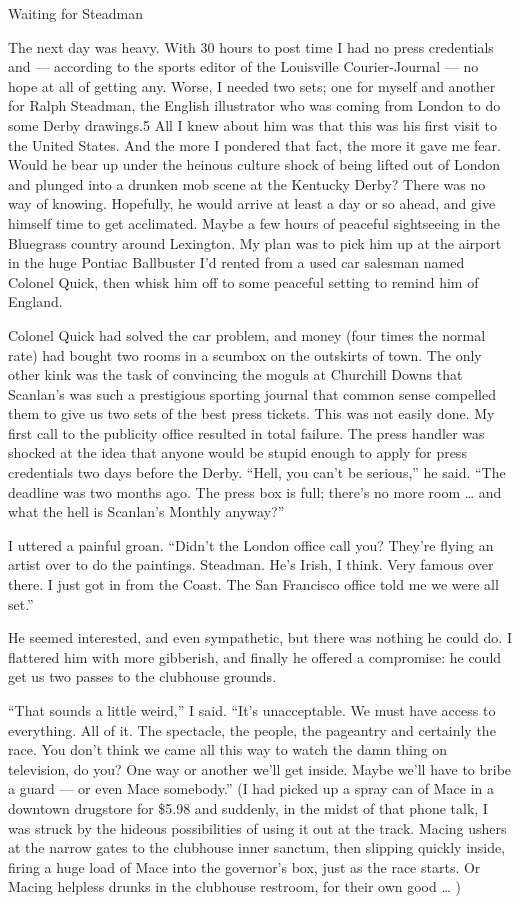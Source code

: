 \documentclass[10pt,a4paper]{article}
\begin{document}
Waiting for Steadman

The next day was heavy. With 30 hours to post time I had no press credentials and — according to the sports editor of the Louisville Courier-Journal — no hope at all of getting any. Worse, I needed two sets; one for myself and another for Ralph Steadman, the English illustrator who was coming from London to do some Derby drawings.5 All I knew about him was that this was his first visit to the United States. And the more I pondered that fact, the more it gave me fear. Would he bear up under the heinous culture shock of being lifted out of London and plunged into a drunken mob scene at the Kentucky Derby? There was no way of knowing. Hopefully, he would arrive at least a day or so ahead, and give himself time to get acclimated. Maybe a few hours of peaceful sightseeing in the Bluegrass country around Lexington. My plan was to pick him up at the airport in the huge Pontiac Ballbuster I’d rented from a used car salesman named Colonel Quick, then whisk him off to some peaceful setting to remind him of England.

Colonel Quick had solved the car problem, and money (four times the normal rate) had bought two rooms in a scumbox on the outskirts of town. The only other kink was the task of convincing the moguls at Churchill Downs that Scanlan’s was such a prestigious sporting journal that common sense compelled them to give us two sets of the best press tickets. This was not easily done. My first call to the publicity office resulted in total failure. The press handler was shocked at the idea that anyone would be stupid enough to apply for press credentials two days before the Derby. “Hell, you can’t be serious,” he said. “The deadline was two months ago. The press box is full; there’s no more room … and what the hell is Scanlan’s Monthly anyway?”

I uttered a painful groan. “Didn’t the London office call you? They’re flying an artist over to do the paintings. Steadman. He’s Irish, I think. Very famous over there. I just got in from the Coast. The San Francisco office told me we were all set.”

He seemed interested, and even sympathetic, but there was nothing he could do. I flattered him with more gibberish, and finally he offered a compromise: he could get us two passes to the clubhouse grounds.

“That sounds a little weird,” I said. “It’s unacceptable. We must have access to everything. All of it. The spectacle, the people, the pageantry and certainly the race. You don’t think we came all this way to watch the damn thing on television, do you? One way or another we’ll get inside. Maybe we’ll have to bribe a guard — or even Mace somebody.” (I had picked up a spray can of Mace in a downtown drugstore for \$5.98 and suddenly, in the midst of that phone talk, I was struck by the hideous possibilities of using it out at the track. Macing ushers at the narrow gates to the clubhouse inner sanctum, then slipping quickly inside, firing a huge load of Mace into the governor’s box, just as the race starts. Or Macing helpless drunks in the clubhouse restroom, for their own good … )
\end{document}
